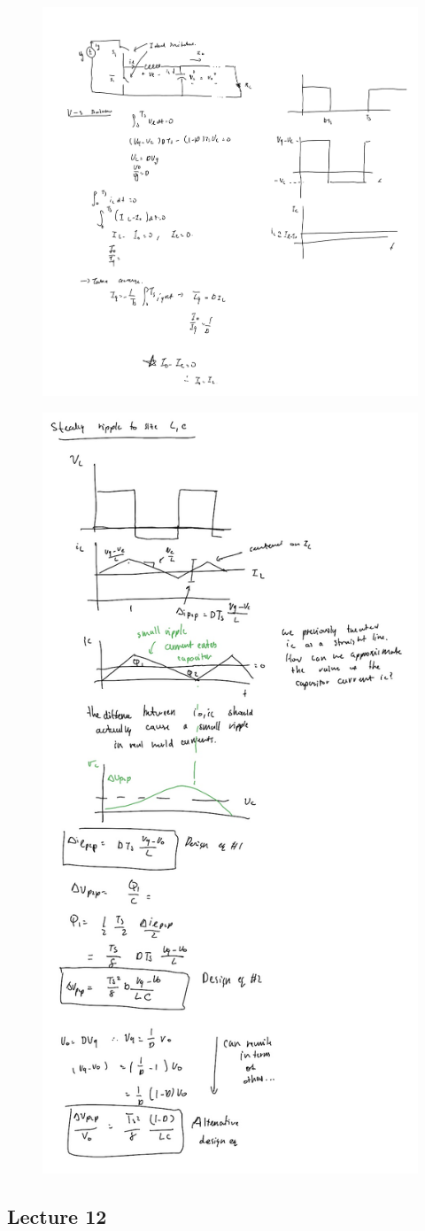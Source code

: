\documentclass[../notes.tex]{subfiles}
\begin{document}
\begin{figure}[H]
	\centering
	\includegraphics[width=\linewidth]{img/image_2022-09-29-11-58-31.png}
\end{figure}

\begin{fullpage}

\begin{figure}[H]
	\centering
	\includegraphics[width=0.6\linewidth]{img/image_2022-09-29-11-58-49.png}
\end{figure}

\end{fullpage}


\subsection{Lecture 12}
\end{document}
